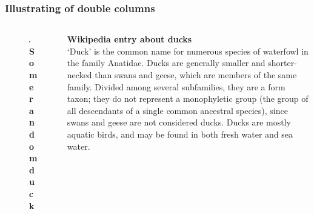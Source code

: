 \documentclass[aspectratio=169]{beamer} %
\begin{document}
\begin{frame}[t]
	\frametitle{Illustrating of double columns}
	\begin{columns}
		\begin{column}{0.5\textwidth}
			\begin{figure}[htpb]
				\centering
				\includegraphics[width=0.8\linewidth]{duck_a.jpeg}
				\caption{{\bf Some random duck}}%
			\end{figure}
		\end{column}
		\begin{column}{0.5\textwidth}
			{\bf Wikipedia entry about ducks} \\
			`Duck' is the common name for numerous species of
			waterfowl in the family Anatidae. Ducks are generally
			smaller and shorter-necked than swans and geese, which
			are members of the same family. Divided among several
			subfamilies, they are a form taxon; they do not
			represent a monophyletic group (the group of all
			descendants of a single common ancestral species),
			since swans and geese are not considered ducks. Ducks
			are mostly aquatic birds, and may be found in both
			fresh water and sea water.
		\end{column} 
	\end{columns} 
\end{frame}
\end{document}
